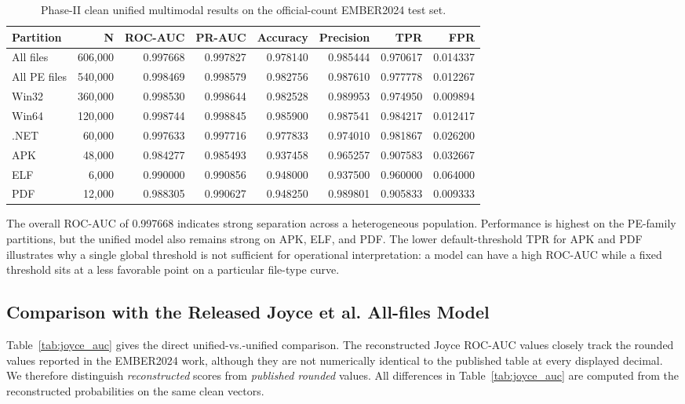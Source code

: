 \documentclass[conference]{IEEEtran}
\begin{document}
\begin{table}[t]
\centering
\caption{Phase-II clean unified multimodal results on the official-count EMBER2024 test set.}
\label{tab:phase2_metrics}
\scriptsize
\setlength{\tabcolsep}{4.0pt}
\renewcommand{\arraystretch}{1.08}
\begin{tabular}{lrrrrrrr}
\toprule
\textbf{Partition} & \textbf{N} & \textbf{ROC-AUC} & \textbf{PR-AUC} & \textbf{Accuracy} & \textbf{Precision} & \textbf{TPR} & \textbf{FPR} \\
\midrule
All files & 606,000 & 0.997668 & 0.997827 & 0.978140 & 0.985444 & 0.970617 & 0.014337 \\
All PE files & 540,000 & 0.998469 & 0.998579 & 0.982756 & 0.987610 & 0.977778 & 0.012267 \\
Win32 & 360,000 & 0.998530 & 0.998644 & 0.982528 & 0.989953 & 0.974950 & 0.009894 \\
Win64 & 120,000 & 0.998744 & 0.998845 & 0.985900 & 0.987541 & 0.984217 & 0.012417 \\
.NET & 60,000 & 0.997633 & 0.997716 & 0.977833 & 0.974010 & 0.981867 & 0.026200 \\
APK & 48,000 & 0.984277 & 0.985493 & 0.937458 & 0.965257 & 0.907583 & 0.032667 \\
ELF & 6,000 & 0.990000 & 0.990856 & 0.948000 & 0.937500 & 0.960000 & 0.064000 \\
PDF & 12,000 & 0.988305 & 0.990627 & 0.948250 & 0.989801 & 0.905833 & 0.009333 \\
\bottomrule
\end{tabular}
\end{table}

The overall ROC-AUC of 0.997668 indicates strong separation across a heterogeneous population. Performance is highest on the PE-family partitions, but the unified model also remains strong on APK, ELF, and PDF. The lower default-threshold TPR for APK and PDF illustrates why a single global threshold is not sufficient for operational interpretation: a model can have a high ROC-AUC while a fixed threshold sits at a less favorable point on a particular file-type curve.

\subsection{Comparison with the Released Joyce et al. All-files Model}
Table~\ref{tab:joyce_auc} gives the direct unified-vs.-unified comparison. The reconstructed Joyce ROC-AUC values closely track the rounded values reported in the EMBER2024 work, although they are not numerically identical to the published table at every displayed decimal. We therefore distinguish \emph{reconstructed} scores from \emph{published rounded} values. All differences in Table~\ref{tab:joyce_auc} are computed from the reconstructed probabilities on the same clean vectors.
\end{document}

